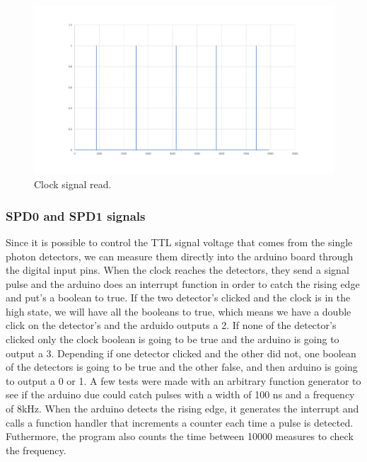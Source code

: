 \begin{refsection}
	\begin{figure}[H]
		\centering
		\includegraphics[width=1\linewidth]{./sdf/arduino_quantum_rx/figures/clockSignal2.pdf}
		\caption{Clock signal read.}
		\label{montage}
	\end{figure}

\subsubsection{SPD0 and SPD1 signals}

Since it is possible to control the TTL signal voltage that comes from the single photon detectors, we can measure them directly into the arduino board through the digital input pins. When the clock reaches the detectors, they send a signal pulse and the arduino does an interrupt function in order to catch the rising edge and put's a boolean to true. If the two detector's clicked and the clock is in the high state, we will have all the booleans to true, which means we have a double click on the detector's and the arduido outputs a 2. If none of the detector's clicked only the clock boolean is going to be true and the arduino is going to output a 3. Depending if one detector clicked and the other did not, one boolean of the detectors is going to be true and the other false, and then arduino is going to output a 0 or 1.
A few tests were made with an arbitrary function generator to see if the arduino due could catch pulses with a width of 100 ns and a frequency of 8kHz. When the arduino detects the rising edge, it generates the interrupt and calls a function handler that increments a counter each time a pulse is detected. Futhermore, the program also counts the time between 10000 measures to check the frequency.


\end{refsection}
